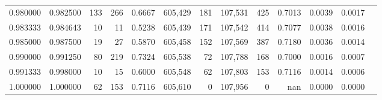 \begin{tabular}{rrrrrrrrrrrrr}
0.980000 & 0.982500 &   133 & 266 &                                     0.6667 & 605,429 &     181 & 107,531 &     425 & 0.7013 & 0.0039 & 0.0017 \\
0.983333 & 0.984643 &    10 &  11 &                                     0.5238 & 605,439 &     171 & 107,542 &     414 & 0.7077 & 0.0038 & 0.0016 \\
0.985000 & 0.987500 &    19 &  27 &                                     0.5870 & 605,458 &     152 & 107,569 &     387 & 0.7180 & 0.0036 & 0.0014 \\
0.990000 & 0.991250 &    80 & 219 &                                     0.7324 & 605,538 &      72 & 107,788 &     168 & 0.7000 & 0.0016 & 0.0007 \\
0.991333 & 0.998000 &    10 &  15 &                                     0.6000 & 605,548 &      62 & 107,803 &     153 & 0.7116 & 0.0014 & 0.0006 \\
1.000000 & 1.000000 &    62 & 153 &                                     0.7116 & 605,610 &       0 & 107,956 &       0 &    nan & 0.0000 & 0.0000 \\
\bottomrule
\end{tabular}
